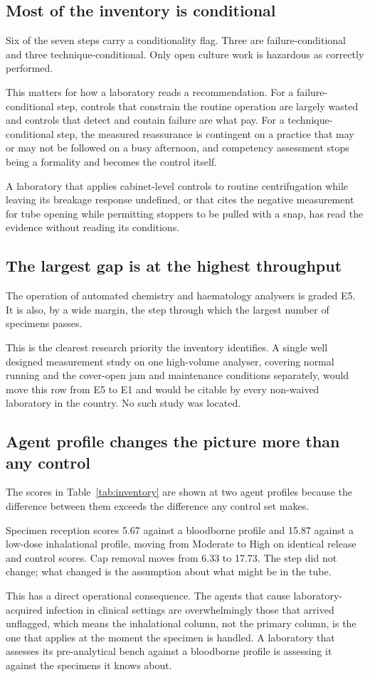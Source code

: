 \subsection{Most of the inventory is conditional}

Six of the seven steps carry a conditionality flag. Three are
failure-conditional and three technique-conditional. Only open culture work is
hazardous as correctly performed.

This matters for how a laboratory reads a recommendation. For a
failure-conditional step, controls that constrain the routine operation are
largely wasted and controls that detect and contain failure are what pay. For a
technique-conditional step, the measured reassurance is contingent on a
practice that may or may not be followed on a busy afternoon, and competency
assessment stops being a formality and becomes the control itself.

A laboratory that applies cabinet-level controls to routine centrifugation
while leaving its breakage response undefined, or that cites the negative
measurement for tube opening while permitting stoppers to be pulled with a
snap, has read the evidence without reading its conditions.

\subsection{The largest gap is at the highest throughput}

The operation of automated chemistry and haematology analysers is graded E5.
It is also, by a wide margin, the step through which the largest number of
specimens passes.

This is the clearest research priority the inventory identifies. A single well
designed measurement study on one high-volume analyser, covering normal running
and the cover-open jam and maintenance conditions separately, would move this
row from E5 to E1 and would be citable by every non-waived laboratory in the
country. No such study was located.

\subsection{Agent profile changes the picture more than any control}

The scores in Table~\ref{tab:inventory} are shown at two agent profiles because
the difference between them exceeds the difference any control set makes.

Specimen reception scores 5.67 against a bloodborne profile and 15.87 against a
low-dose inhalational profile, moving from Moderate to High on identical
release and control scores. Cap removal moves from 6.33 to 17.73. The step did
not change; what changed is the assumption about what might be in the tube.

This has a direct operational consequence. The agents that cause
laboratory-acquired infection in clinical settings are overwhelmingly those
that arrived unflagged, which means the inhalational column, not the primary
column, is the one that applies at the moment the specimen is handled. A
laboratory that assesses its pre-analytical bench against a bloodborne profile
is assessing it against the specimens it knows about.

